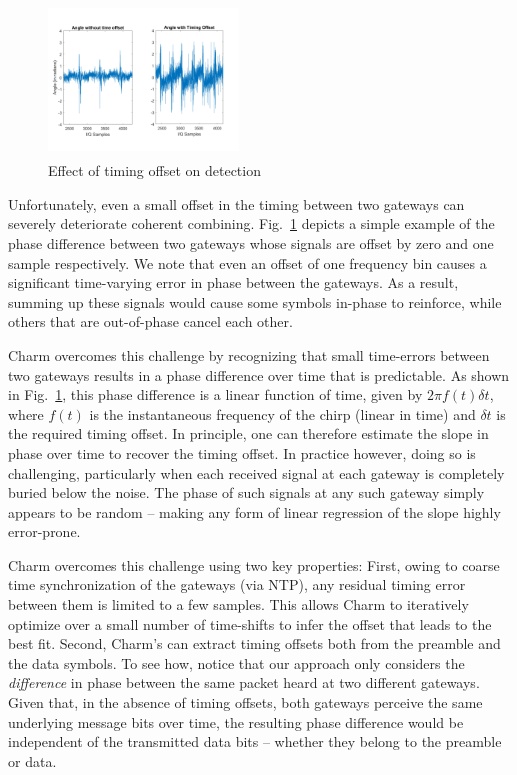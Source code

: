 \begin{figure}
    \centering
    \includegraphics[width=0.45\textwidth, height=1.6in]{figures/TimeOffset.pdf}
    \vspace*{-0.1in}
    \caption{Effect of timing offset on detection}
        \vspace*{-0.0in}

    \label{fig:toffset}
    \compactimg
\end{figure}

Unfortunately, even a small offset in the timing between two gateways can
severely deteriorate coherent combining. Fig.~\ref{fig:toffset} depicts a
simple example of the phase difference between two gateways whose signals are
offset by zero and one sample respectively. We note that even an offset of one
frequency bin causes a significant time-varying error in phase between the
gateways. As a result, summing up these signals would cause some symbols
in-phase to reinforce, while others that are out-of-phase cancel each other.
\vspace*{0.1in}

 Charm overcomes this
challenge by recognizing that small time-errors between two gateways results
in a phase difference over time that is predictable. As shown in
Fig.~\ref{fig:toffset}, this phase difference is a linear function of time,
given by $2\pi f(t) \delta t$, where $f(t)$ is the instantaneous frequency of
the chirp (linear in time) and $\delta t$ is the required timing offset. In
principle, one can therefore estimate the slope in phase over time to recover
the timing offset. In practice however, doing so is challenging, particularly
when each received signal at each gateway is completely buried below the
noise. The phase of such signals at any such gateway simply appears to be
random -- making any form of linear regression of the slope highly
error-prone.

Charm overcomes this challenge using two key properties: First, owing to
coarse time synchronization of the gateways (via NTP), any residual timing
error between them is limited to a few samples. This allows Charm to
iteratively optimize over a small number of time-shifts to infer the offset
that leads to the best fit. Second, Charm's can extract timing offsets both
from the preamble and the data symbols. To see how, notice that our approach
only considers the {\it difference} in phase between the same packet heard at
two different gateways. Given that, in the absence of timing offsets, both
gateways perceive the same underlying message bits over time, the resulting
phase difference would be independent of the transmitted data bits -- whether
they belong to the preamble or data.

